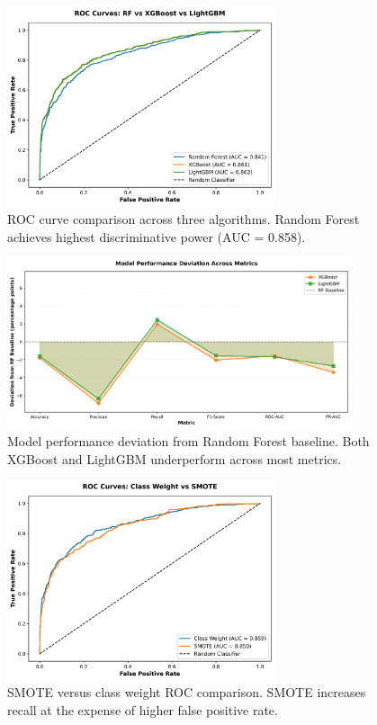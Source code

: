 \documentclass[12pt]{article}
\begin{document}
\begin{figure}[H]
\centering
\includegraphics[width=0.7\textwidth]{img/21_model_comparison_roc.png}
\caption{ROC curve comparison across three algorithms. Random Forest achieves highest discriminative power (AUC = 0.858).}
\label{fig:model_comparison}
\end{figure}

\begin{figure}[H]
\centering
\includegraphics[width=0.9\textwidth]{img/24_model_comparison_metrics.png}
\caption{Model performance deviation from Random Forest baseline. Both XGBoost and LightGBM underperform across most metrics.}
\label{fig:metrics_comparison}
\end{figure}

\begin{figure}[H]
\centering
\includegraphics[width=0.7\textwidth]{img/25_smote_roc_comparison.png}
\caption{SMOTE versus class weight ROC comparison. SMOTE increases recall at the expense of higher false positive rate.}
\label{fig:smote_roc}
\end{figure}
\end{document}
